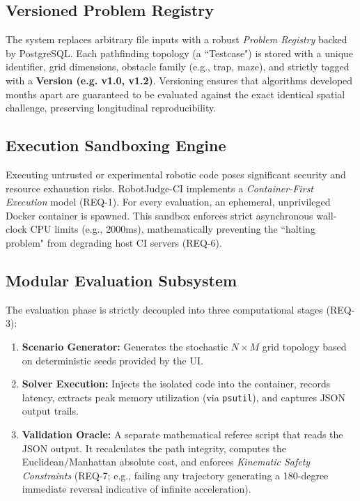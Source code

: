 \documentclass[conference]{IEEEtran}
\begin{document}
\subsection{Versioned Problem Registry}
The system replaces arbitrary file inputs with a robust \textit{Problem Registry} backed by PostgreSQL. Each pathfinding topology (a ``Testcase") is stored with a unique identifier, grid dimensions, obstacle family (e.g., trap, maze), and strictly tagged with a \textbf{Version (e.g. v1.0, v1.2)}. Versioning ensures that algorithms developed months apart are guaranteed to be evaluated against the exact identical spatial challenge, preserving longitudinal reproducibility.

\subsection{Execution Sandboxing Engine}
Executing untrusted or experimental robotic code poses significant security and resource exhaustion risks. RobotJudge-CI implements a \textit{Container-First Execution} model (REQ-1). For every evaluation, an ephemeral, unprivileged Docker container is spawned. This sandbox enforces strict asynchronous wall-clock CPU limits (e.g., 2000ms), mathematically preventing the ``halting problem" from degrading host CI servers (REQ-6). 

\subsection{Modular Evaluation Subsystem}
The evaluation phase is strictly decoupled into three computational stages (REQ-3):
\begin{enumerate}
    \item \textbf{Scenario Generator:} Generates the stochastic $N \times M$ grid topology based on deterministic seeds provided by the UI.
    \item \textbf{Solver Execution:} Injects the isolated code into the container, records latency, extracts peak memory utilization (via \texttt{psutil}), and captures JSON output trails.
    \item \textbf{Validation Oracle:} A separate mathematical referee script that reads the JSON output. It recalculates the path integrity, computes the Euclidean/Manhattan absolute cost, and enforces \textit{Kinematic Safety Constraints} (REQ-7; e.g., failing any trajectory generating a 180-degree immediate reversal indicative of infinite acceleration). 
\end{enumerate}
\end{document}
